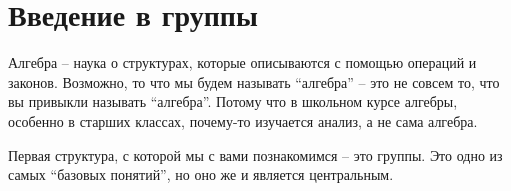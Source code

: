 \documentclass[11pt, twoside]{article}
\begin{document}
\tableofcontents
\pagebreak

\section{Введение в группы}

Алгебра -- наука о структурах, которые описываются с помощью операций и законов. 
Возможно, то что мы будем называть ``алгебра'' -- это не совсем то, что вы привыкли называть ``алгебра''. 
Потому что в школьном курсе алгебры, особенно в старших классах, почему-то изучается анализ, а не сама алгебра.

Первая структура, с которой мы с вами познакомимся -- это группы.
Это одно из самых ``базовых понятий'', но оно же и является центральным. 



\end{document}
